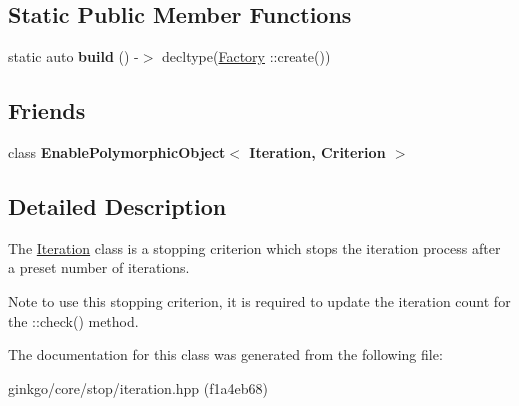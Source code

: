 \subsection*{Static Public Member Functions}
\begin{DoxyCompactItemize}
\item 
\mbox{\label{classgko_1_1stop_1_1Iteration_a8175519c5dad57f41f8bdec83c04585d}} 
static auto {\bfseries build} () -\/$>$ decltype(\hyperlink{classgko_1_1stop_1_1Iteration_1_1Factory}{Factory} \+::create())
\end{DoxyCompactItemize}
\subsection*{Friends}
\begin{DoxyCompactItemize}
\item 
\mbox{\label{classgko_1_1stop_1_1Iteration_a53441469892d9e127b487d868cd90aee}} 
class {\bfseries Enable\+Polymorphic\+Object$<$ Iteration, Criterion $>$}
\end{DoxyCompactItemize}


\subsection{Detailed Description}
The \hyperlink{classgko_1_1stop_1_1Iteration}{Iteration} class is a stopping criterion which stops the iteration process after a preset number of iterations. 

\begin{DoxyNote}{Note}
to use this stopping criterion, it is required to update the iteration count for the \+::check() method. 
\end{DoxyNote}


The documentation for this class was generated from the following file\+:\begin{DoxyCompactItemize}
\item 
ginkgo/core/stop/iteration.\+hpp (f1a4eb68)\end{DoxyCompactItemize}
